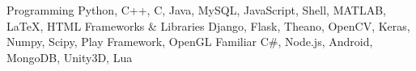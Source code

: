 \begin{cvskills}
  \cvskill
    {Programming}
    {Python, C++, C, Java, MySQL, JavaScript, Shell, MATLAB, LaTeX, HTML}
  \cvskill
    {Frameworks \& Libraries}
    {Django, Flask, Theano, OpenCV, Keras, Numpy, Scipy, Play Framework, OpenGL}
  \cvskill
    {Familiar}
    {C\#, Node.js, Android, MongoDB, Unity3D, Lua}
\end{cvskills}